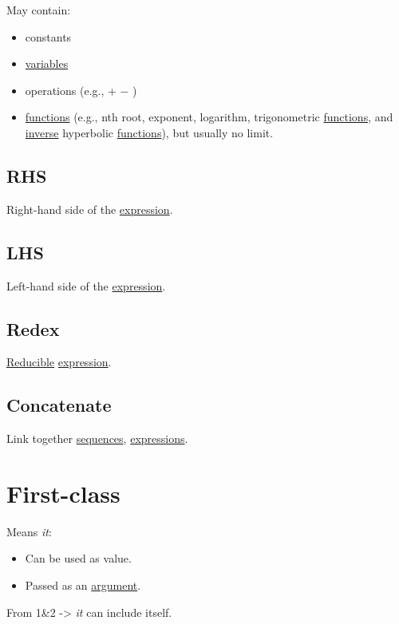 \documentclass[a4paper,14pt,oneside]{book}
\begin{document}
May contain:\\
\begin{itemize}
\item constants\\
\item \hyperref[org8831698]{variables}\\
\item operations (e.g., + − \texttimes{} \textdiv{})\\
\item \hyperref[org0bd6046]{functions} (e.g., nth root, exponent, logarithm, trigonometric \hyperref[org0bd6046]{functions}, and \hyperref[org51e2137]{inverse} hyperbolic \hyperref[org0bd6046]{functions}), but usually no limit.\\
\end{itemize}

\section{\label{org07d776d}RHS}
\label{sec:org4a058f1}
Right-hand side of the \hyperref[org6aa6989]{expression}.\\

\section{\label{org2aaa476}LHS}
\label{sec:orgca129ca}
Left-hand side of the \hyperref[org6aa6989]{expression}.\\

\section{\label{org4745b84}Redex}
\label{sec:org7eae5db}
\hyperref[org0de162d]{Reducible} \hyperref[org6aa6989]{expression}.\\

\section{\label{orgedd9ef8}Concatenate}
\label{sec:org1c54d92}
Link together \hyperref[org70bc57b]{sequences}, \hyperref[org8896d2c]{expressions}.\\

\chapter{\label{org805a116}First-class}
\label{sec:org801cc1f}
Means \emph{it}:\\
\begin{itemize}
\item Can be used as value.\\
\item Passed as an \hyperref[org8cb9182]{argument}.\\
\end{itemize}
From 1\&2 -> \emph{it} can include itself.\\
\end{document}
